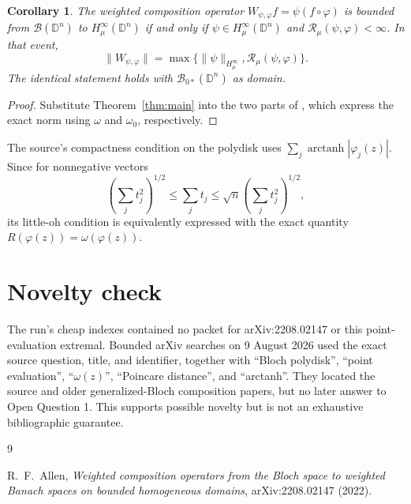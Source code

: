 \documentclass[11pt]{article}
\newtheorem{corollary}[theorem]{Corollary}
\newcommand{\D}{\mathbb D}
\newcommand{\Bspace}{\mathcal B}
\newcommand{\atanh}{\operatorname{arctanh}}
\begin{document}
\begin{corollary}\label{cor:norm}
The weighted composition operator
$W_{\psi,\varphi}f=\psi(f\circ\varphi)$ is bounded from
$\Bspace(\D^n)$ to $H^\infty_\mu(\D^n)$ if and only if
$\psi\in H^\infty_\mu(\D^n)$ and $\mathcal R_\mu(\psi,\varphi)<\infty$.
In that event,
\[
 \|W_{\psi,\varphi}\|
 =\max\{\|\psi\|_{H^\infty_\mu},\mathcal R_\mu(\psi,\varphi)\}.
\]
The identical statement holds with $\Bspace_{0*}(\D^n)$ as domain.
\end{corollary}

\begin{proof}
Substitute Theorem~\ref{thm:main} into the two parts of
\cite[Theorem 3.3]{Allen}, which express the exact norm using $\omega$ and
$\omega_0$, respectively.
\end{proof}

The source's compactness condition on the polydisk uses
$\sum_j\atanh|\varphi_j(z)|$.  Since for nonnegative vectors
\[
 \left(\sum_jt_j^2\right)^{1/2}\leq\sum_jt_j
 \leq\sqrt n\left(\sum_jt_j^2\right)^{1/2},
\]
its little-oh condition is equivalently expressed with the exact quantity
$R(\varphi(z))=\omega(\varphi(z))$.

\section{Novelty check}

The run's cheap indexes contained no packet for arXiv:2208.02147 or this
point-evaluation extremal.  Bounded arXiv searches on 9 August 2026 used the
exact source question, title, and identifier, together with ``Bloch
polydisk'', ``point evaluation'', ``$\omega(z)$'', ``Poincare distance'', and
``arctanh''.  They located the source and older generalized-Bloch composition
papers, but no later answer to Open Question 1.  This supports possible
novelty but is not an exhaustive bibliographic guarantee.

\begin{thebibliography}{9}

R.~F.~Allen,
\emph{Weighted composition operators from the Bloch space to weighted Banach
spaces on bounded homogeneous domains},
arXiv:2208.02147 (2022).

\end{thebibliography}
\end{document}
